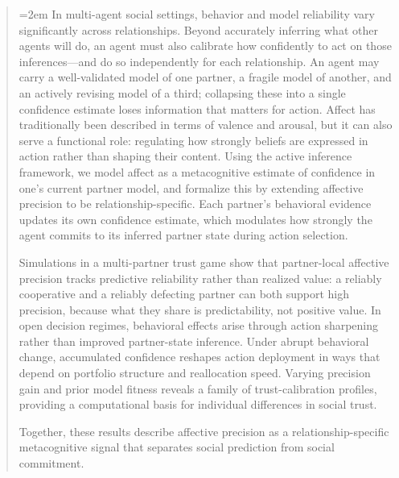 \begin{abstract}
\emergencystretch=2em
In multi-agent social settings, behavior and model reliability vary significantly across relationships. Beyond accurately inferring what other agents will do, an agent must also calibrate how confidently to act on those inferences---and do so independently for each relationship. An agent may carry a well-validated model of one partner, a fragile model of another, and an actively revising model of a third; collapsing these into a single confidence estimate loses information that matters for action. Affect has traditionally been described in terms of valence and arousal, but it can also serve a functional role: regulating how strongly beliefs are expressed in action rather than shaping their content. Using the active inference framework, we model affect as a metacognitive estimate of confidence in one's current partner model, and formalize this by extending affective precision to be relationship-specific. Each partner's behavioral evidence updates its own confidence estimate, which modulates how strongly the agent commits to its inferred partner state during action selection.

Simulations in a multi-partner trust game show that partner-local affective precision tracks predictive reliability rather than realized value: a reliably cooperative and a reliably defecting partner can both support high precision, because what they share is predictability, not positive value. In open decision regimes, behavioral effects arise through action sharpening rather than improved partner-state inference. Under abrupt behavioral change, accumulated confidence reshapes action deployment in ways that depend on portfolio structure and reallocation speed. Varying precision gain and prior model fitness reveals a family of trust-calibration profiles, providing a computational basis for individual differences in social trust.

Together, these results describe affective precision as a relationship-specific metacognitive signal that separates social prediction from social commitment.

\end{abstract}
